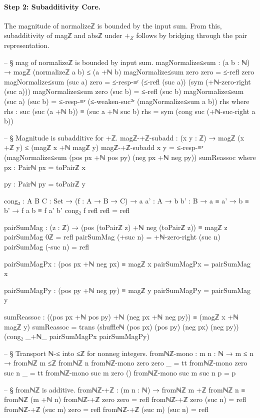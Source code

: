 \documentclass[11pt,a4paper]{book}
\def\mathbb#1{#1}%
\def\texttt#1{#1}%
\begin{document}
\paragraph{Step 2: Subadditivity Core.}
The magnitude of \texttt{normalizeℤ} is bounded by the input sum.
From this, subadditivity of \texttt{magℤ} and \texttt{absℤ} under $+_{\mathbb{Z}}$
follows by bridging through the pair representation.

\begin{code}
-- § mag of normalizeℤ is bounded by input sum.
magNormalize≤sum : (a b : ℕ) → magℤ (normalizeℤ a b) ≤ (a +ℕ b)
magNormalize≤sum zero zero = ≤-refl zero
magNormalize≤sum (suc a) zero =
  ≤-resp-≡ʳ
    (≤-refl (suc a))
    (sym (+ℕ-zero-right (suc a)))
magNormalize≤sum zero (suc b) = ≤-refl (suc b)
magNormalize≤sum (suc a) (suc b) =
  ≤-resp-≡ʳ
    (≤-weaken-suc²ʳ (magNormalize≤sum a b))
    rhs
  where
    rhs : suc (suc (a +ℕ b)) ≡ (suc a +ℕ suc b)
    rhs = sym (cong suc (+ℕ-suc-right a b))

-- § Magnitude is subadditive for +ℤ.
magℤ-+ℤ-subadd : (x y : ℤ) → magℤ (x +ℤ y) ≤ (magℤ x +ℕ magℤ y)
magℤ-+ℤ-subadd x y =
  ≤-resp-≡ʳ
    (magNormalize≤sum (pos px +ℕ pos py) (neg px +ℕ neg py))
    sumReassoc
  where
    px : Pairℕ
    px = toPairℤ x

    py : Pairℕ
    py = toPairℤ y

    cong₂ : {A B C : Set} → (f : A → B → C) → {a a' : A} → {b b' : B} → a ≡ a' → b ≡ b' → f a b ≡ f a' b'
    cong₂ f refl refl = refl

    pairSumMag : (z : ℤ) → (pos (toPairℤ z) +ℕ neg (toPairℤ z)) ≡ magℤ z
    pairSumMag 0ℤ = refl
    pairSumMag (+suc n) = +ℕ-zero-right (suc n)
    pairSumMag (-suc n) = refl

    pairSumMagPx : (pos px +ℕ neg px) ≡ magℤ x
    pairSumMagPx = pairSumMag x

    pairSumMagPy : (pos py +ℕ neg py) ≡ magℤ y
    pairSumMagPy = pairSumMag y

    sumReassoc :
      ((pos px +ℕ pos py) +ℕ (neg px +ℕ neg py))
        ≡
      (magℤ x +ℕ magℤ y)
    sumReassoc =
      trans
        (shuffleℕ (pos px) (pos py) (neg px) (neg py))
        (cong₂ _+ℕ_ pairSumMagPx pairSumMagPy)

-- § Transport ℕ-≤ into ≤ℤ for nonneg integers.
fromℕℤ-mono : {m n : ℕ} → m ≤ n → fromℕℤ m ≤ℤ fromℕℤ n
fromℕℤ-mono {zero} {zero} _ = tt
fromℕℤ-mono {zero} {suc n} _ = tt
fromℕℤ-mono {suc m} {zero} ()
fromℕℤ-mono {suc m} {suc n} p = p

-- § fromℕℤ is additive.
fromℕℤ-+ℤ : (m n : ℕ) → fromℕℤ m +ℤ fromℕℤ n ≡ fromℕℤ (m +ℕ n)
fromℕℤ-+ℤ zero zero = refl
fromℕℤ-+ℤ zero (suc n) = refl
fromℕℤ-+ℤ (suc m) zero = refl
fromℕℤ-+ℤ (suc m) (suc n) = refl


\end{code}
\end{document}
